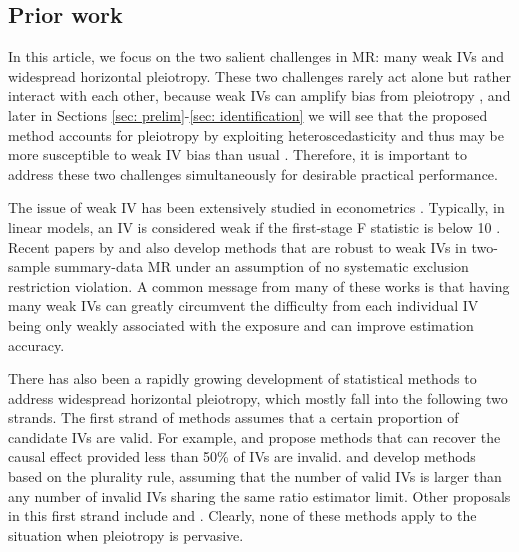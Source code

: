 \documentclass[12pt]{article}
\begin{document}
\subsection{Prior work}
In this article, we focus on the two salient challenges in MR: many weak IVs and widespread horizontal pleiotropy. These two challenges rarely act alone but rather interact with each other, because  weak IVs can amplify bias from pleiotropy  \citep{Small:2008aa}, and later in Sections \ref{sec: prelim}-\ref{sec: identification} we will see that the proposed method accounts for pleiotropy by exploiting heteroscedasticity and thus may be  more susceptible to weak IV bias than usual \citep{Lewbel:2012aa}. Therefore, it is important to address these two challenges simultaneously for desirable practical performance.  


The issue of weak IV has been  extensively studied in econometrics \citep{Staiger:1997aa,  Chao:2005aa, Hansen:2008aa, Newey:2009aa, Stock:2002aa}. Typically, in linear models, an IV is considered weak if the first-stage F statistic is below 10 \citep{Stock:2002aa}.  
Recent papers by \cite{Zhao:2019aa, zhao2018statistical,  wang2019weakinstrument} and \cite{ye2021debiased} also develop methods that are robust to weak IVs in two-sample summary-data MR under an assumption of no systematic exclusion restriction violation. A common message from many of these works is that having many weak IVs can greatly circumvent  the difficulty from each individual IV being only weakly associated with the exposure and can improve estimation accuracy. 


There has also been a rapidly growing development of statistical methods to address widespread horizontal pleiotropy, which mostly fall into the following two strands. The first strand of methods assumes that a certain proportion of candidate IVs are valid. For example,  \cite{Han:2008aa, Kang:2016aa, Bowden:2016aa} and \cite{Windmeijer:2019aa} propose methods that can recover the causal effect provided less than 50\% of IVs are invalid. \cite{Hartwig:2017aa, Guo:2018aa, guo2021post} and \cite{windmeijer2021confidence} develop methods based on the plurality rule,  assuming that the number of valid IVs is larger than any number of invalid IVs sharing the same ratio estimator limit. Other proposals in this first strand include  \cite{qi2019mendelian} and \cite{Verbanck:2018aa}. Clearly, none of these methods apply to the situation when pleiotropy is pervasive.  
\end{document}
